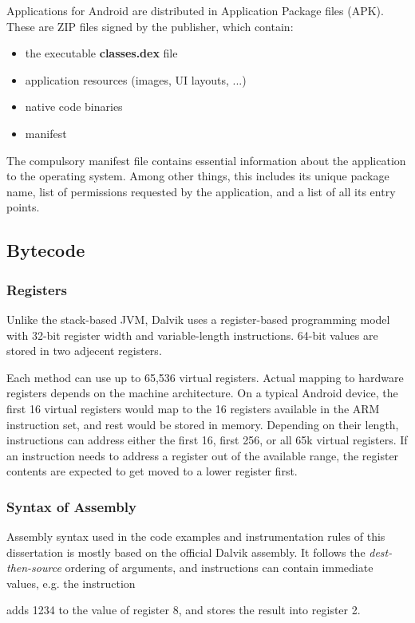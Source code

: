 \documentclass[12pt,twoside,notitlepage]{report}
\newcommand{\centerbox}[1] {
	\begin{center}
		\minibox{#1}
	\end{center}
}
\newcommand{\asm}[1] {\small{\textsf{#1}}}
\begin{document}
Applications for Android are distributed in Application Package files (APK). These are ZIP files signed by the publisher, which contain:
\begin{itemize}
\item the executable \textbf{classes.dex} file
\item application resources (images, UI layouts, ...)
\item native code binaries
\item manifest
\end{itemize}

The compulsory manifest file contains essential information about the application to the operating system. Among other things, this includes its unique package name, list of permissions requested by the application, and a list of all its entry points.

\subsection{Bytecode}

\subsubsection{Registers}

Unlike the stack-based JVM, Dalvik uses a register-based programming model with 32-bit register width and variable-length instructions. 64-bit values are stored in two adjecent registers.

Each method can use up to 65,536 virtual registers. Actual mapping to hardware registers depends on the machine architecture. On a typical Android device, the first 16 virtual registers would map to the 16 registers available in the ARM instruction set, and rest would be stored in memory. Depending on their length, instructions can address either the first 16, first 256, or all 65k virtual registers. If an instruction needs to address a register out of the available range, the register contents are expected to get moved to a lower register first.

\subsubsection{Syntax of Assembly}
Assembly syntax used in the code examples and instrumentation rules of this dissertation is mostly based on the official Dalvik assembly. It follows the \emph{dest-then-source} ordering of arguments, and instructions can contain immediate values, e.g. the instruction
		\centerbox{
			\asm{add-int/lit16 v2, v8, \#1234}
		}
adds 1234 to the value of register 8, and stores the result into register 2. 
\end{document}
